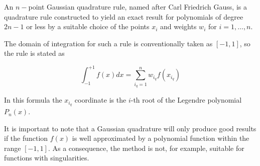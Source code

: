 An $n-$point Gaussian quadrature rule, named after Carl Friedrich Gauss, is a quadrature rule constructed
to yield an exact result for polynomials of degree $2n-1$ or less by a suitable choice of the points $x_i$
and weights $w_i$ for $i=1,\dots,n$.

The domain of integration for such a rule is conventionally taken as $[-1,1]$, so the rule is stated as
\begin{mdframed}[backgroundcolor=blue!5]
\[
\int_{-1}^{+1} f(x) dx = \sum_{i_q=1}^n w_{i_q} f(x_{i_q})
\]
\end{mdframed}
In this formula the $x_{i_q}$ coordinate is 
the $i$-th root of the {\color{olive} Legendre polynomial} $P_n(x)$. 

It is important to note that a Gaussian quadrature will only produce good results if the function $f(x)$
is well approximated by a polynomial function within the range $[-1,1]$.
As a consequence, the method is not, for example, suitable for functions with singularities.


